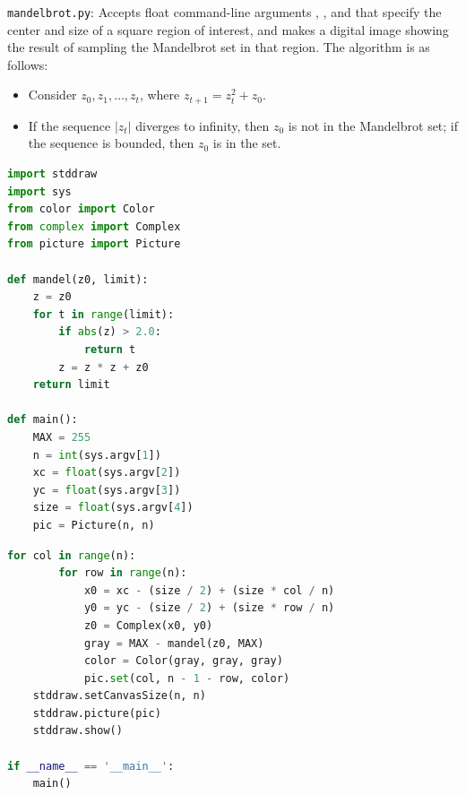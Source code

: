 \documentclass[8pt,a4paper,compress,handout]{beamer}
\begin{document}
\begin{frame}[fragile]
\begin{framed}
\tiny \lstinline{mandelbrot.py}: Accepts float command-line arguments , , and  that specify the center and size of a square region of interest, and makes a digital image showing the result of sampling the Mandelbrot set in that region. The algorithm is as follows:
\begin{itemize}
\item Consider $z_0, z_1, \dots, z_t$, where $z_{t+1}=z_t^2+z_0$. 
\item If the sequence $|z_t|$ diverges to infinity, then $z_0$ is not in the Mandelbrot set; if the sequence is bounded, then $z_0$ is in the set.
\end{itemize}
\end{framed}

\begin{lstlisting}[language=Python]
import stddraw
import sys
from color import Color
from complex import Complex
from picture import Picture

def mandel(z0, limit):
    z = z0
    for t in range(limit):
        if abs(z) > 2.0:
            return t
        z = z * z + z0
    return limit

def main():
    MAX = 255
    n = int(sys.argv[1])
    xc = float(sys.argv[2])
    yc = float(sys.argv[3])
    size = float(sys.argv[4])
    pic = Picture(n, n)
\end{lstlisting}
\end{frame}

\begin{frame}[fragile]
\begin{lstlisting}[language=Python]
    for col in range(n):
        for row in range(n):
            x0 = xc - (size / 2) + (size * col / n)
            y0 = yc - (size / 2) + (size * row / n)
            z0 = Complex(x0, y0)
            gray = MAX - mandel(z0, MAX)
            color = Color(gray, gray, gray)
            pic.set(col, n - 1 - row, color)
    stddraw.setCanvasSize(n, n)
    stddraw.picture(pic)
    stddraw.show()

if __name__ == '__main__':
    main()
\end{lstlisting}
\end{frame}
\end{document}
